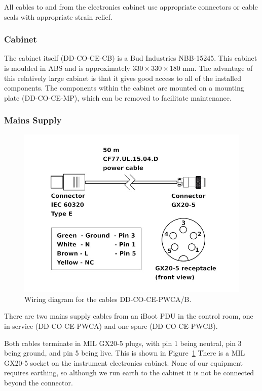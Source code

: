 \documentclass{article}
\begin{document}
All cables to and from the electronics cabinet use appropriate connectors or cable seals with appropriate strain relief.

\subsubsection{Cabinet}

The cabinet itself (DD-CO-CE-CB) is a Bud Industries NBB-15245. This cabinet is moulded in ABS and is approximately $330 \times 330 \times 180$ mm. The advantage of this relatively large cabinet is that it gives good access to all of the installed components. The components within the cabinet are mounted on a mounting plate (DD-CO-CE-MP), which can be removed to facilitate maintenance.

\subsubsection{Mains Supply}

\begin{figure}[tp]
\begin{center}
\includegraphics[width=0.9\linewidth]{figures/DR-CO-CE-PWC}
\end{center}
\caption{Wiring diagram for the cables DD-CO-CE-PWCA/B.}
\label{figure:DD-CO-CE-PWC}
\end{figure}

There are two mains supply cables from an iBoot PDU in the control room, one in-service (DD-CO-CE-PWCA) and one spare (DD-CO-CE-PWCB).

Both cables terminate in MIL GX20-5 plugs, with pin 1 being neutral, pin 3 being ground, and pin 5 being live. This is shown in Figure~\ref{figure:DD-CO-CE-PWC}
There is a MIL GX20-5 socket on the instrument electronics cabinet. None of our equipment requires earthing, so although we run earth to the cabinet it is not be connected beyond the connector.
\end{document}
